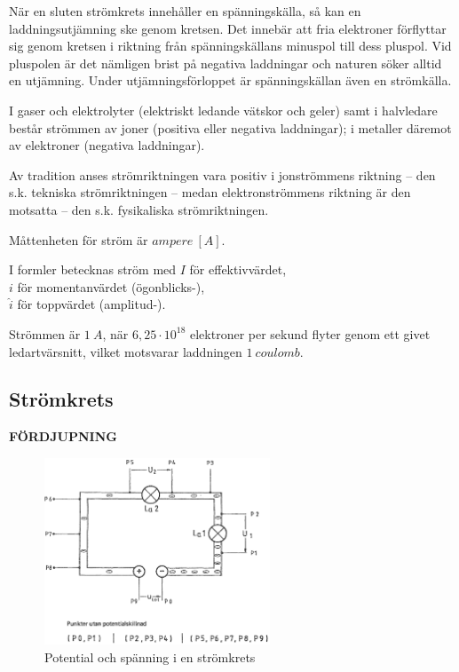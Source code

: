 När en sluten strömkrets innehåller en spänningskälla, så kan en
laddningsutjämning ske genom kretsen.
Det innebär att fria elektroner förflyttar sig genom kretsen i riktning från
spänningskällans minuspol till dess pluspol.
Vid pluspolen är det nämligen brist på negativa laddningar och naturen söker
alltid en utjämning.
Under utjämningsförloppet är spänningskällan även en strömkälla.

I gaser och elektrolyter (elektriskt ledande vätskor och geler) samt i
halvledare består strömmen av joner (positiva eller negativa laddningar);
i metaller däremot av elektroner (negativa laddningar).

Av tradition anses strömriktningen vara positiv i jonströmmens riktning -- den
s.k. tekniska strömriktningen -- medan elektronströmmens riktning är den
motsatta -- den s.k. fysikaliska strömriktningen.

Måttenheten för ström är \(ampere\ [A]\).

I formler betecknas ström med
\(I\) för effektivvärdet,\\
\(i\) för momentanvärdet (ögonblicks-),\\
\(\hat{i}\) för toppvärdet (amplitud-).

Strömmen är \(1\ A\), när \(6,25 \cdot 10^{18}\) elektroner per sekund flyter
genom ett givet ledartvärsnitt, vilket motsvarar laddningen \(1\ coulomb\).

\subsection{Strömkrets}
\textbf{FÖRDJUPNING}

\begin{figure}
\begin{center}
\includegraphics[width=0.6\textwidth]{images/cropped_pdfs/bild_2_1-03.pdf}
\caption{Potential och spänning i en strömkrets}
\label{fig:BildII1-3}
\end{center}
\end{figure}

